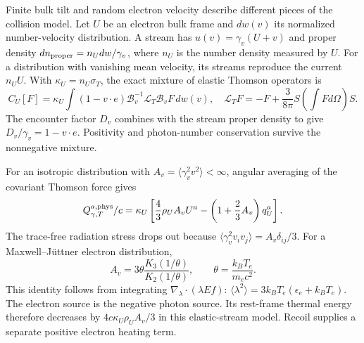 Finite bulk tilt and random electron velocity describe different pieces of the collision model. Let $U$ be an electron bulk frame and $dw(v)$ its normalized number-velocity distribution. A stream has $u(v)=\gamma_v(U+v)$ and proper density $dn_{\rm proper}=n_Udw/\gamma_v$, where $n_U$ is the number density measured by $U$. For a distribution with vanishing mean velocity, its streams reproduce the current $n_UU$. With $\kappa_U=n_U\sigma_T$, the exact mixture of elastic Thomson operators is
\begin{equation}
 C_U[F]=\kappa_U\int(1-v\cdot e)
      \mathcal B_v^{-1}\mathscr L_T\mathcal B_vF\,dw(v),
 \quad
 \mathscr L_TF=-F+\frac3{8\pi}S\left(\int Fd\Omega\right)S.
 \label{ii:thermal_mixture}
\end{equation}
The encounter factor $D_v$ combines with the stream proper density to give $D_v/\gamma_v=1-v\cdot e$. Positivity and photon-number conservation survive the nonnegative mixture.

For an isotropic distribution with $A_v=\langle\gamma_v^2v^2\rangle<\infty$, angular averaging of the covariant Thomson force gives
\begin{equation}
 Q_{\gamma,T}^{a,\rm phys}/c
  =\kappa_U\left[\frac43\rho_UA_vU^a
              -\left(1+\frac23A_v\right)q_U^a\right].
 \label{ii:thermal_force}
\end{equation}
The trace-free radiation stress drops out because
$\langle\gamma_v^2v_iv_j\rangle=A_v\delta_{ij}/3$.
For a Maxwell--J\"uttner electron distribution,
\begin{equation}
 A_v=3\theta\frac{K_3(1/\theta)}{K_2(1/\theta)},\qquad
 \theta=\frac{k_BT_e}{m_ec^2}.
 \label{ii:thermal_moment}
\end{equation}
This identity follows from integrating
$\nabla_\lambda\cdot(\lambda E f)$:
$\langle\lambda^2\rangle=3k_BT_e(\epsilon_e+k_BT_e)$.
The electron source is the negative photon source. Its rest-frame thermal energy therefore decreases by $4c\kappa_U\rho_UA_v/3$ in this elastic-stream model. Recoil supplies a separate positive electron heating term.

